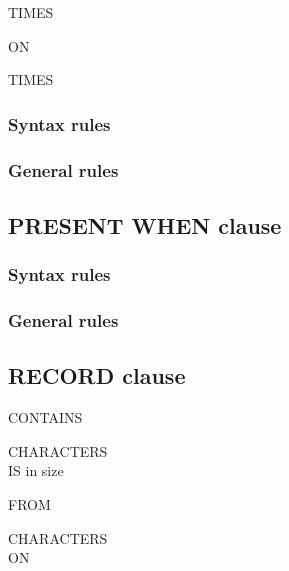 \begin{syntax}
   \integer
  \begin{0-1}
     \integer
  \end{0-1}
  TIMES
  \begin{0-1}
     ON \identifier
  \end{0-1}
  \begin{0-1}
     \integer
  \end{0-1}
\end{syntax}

\begin{syntax}
   \integer TIMES
\end{syntax}

\subsubsection{Syntax rules}

\subsubsection{General rules}

\subsection{PRESENT WHEN clause}
\begin{syntax}
    \condition
\end{syntax}

\subsubsection{Syntax rules}

\subsubsection{General rules}

\subsection{RECORD clause}
\begin{syntax}
  \begin{1=}
    CONTAINS \integer
    \begin{0-1}
       \integer
    \end{0-1}
    CHARACTERS \\
    IS  in size
    \begin{0-1}
      FROM \integer
    \end{0-1}
    \begin{0-1}
       \integer
    \end{0-1}
    CHARACTERS \\\qquad
     ON \identifier
  \end{1=}
\end{syntax}

